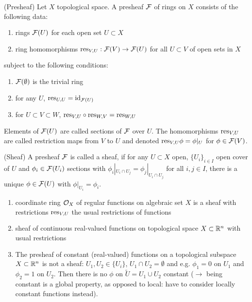 \documentclass[a4paper,11pt]{article}
\begin{document}
			\begin{defi}(Presheaf)
				Let $X$ topological space. A presheaf $\mathcal{F}$ of rings on $X$ consists of the following data:
				\begin{enumerate}
					\item rings $\mathcal{F}(U)$ for each open set $U\subset X$
					\item ring homomorphisms $\mathrm{res}_{V,U}:\mathcal{F}(V)\rightarrow\mathcal{F}(U)$ for all $U\subset V$ of open sets in $X$ 
				\end{enumerate}
				subject to the following conditions:
				\begin{enumerate}
					\item $\mathcal{F}(\emptyset)$ is the trivial ring
					\item for any $U$, $\mathrm{res}_{U,U}=\operatorname{id}_{\mathcal{F}(U)}$
					\item for $U\subset V\subset W$, $\mathrm{res}_{V,U}\circ\mathrm{res}_{W,V}=\mathrm{res}_{W,U}$
				\end{enumerate}
				Elements of $\mathcal{F}(U)$ are called sections of $\mathcal{F}$ over $U$. The homomorphisms $\mathrm{res}_{V,U}$ are called restriction maps from $V$ to $U$ and denoted $\mathrm{res}_{V,U}\phi=\phi|_U$ for $\phi\in\mathcal{F}(V)$.
			\end{defi}

			\begin{defi}
				(Sheaf) A presheaf $\mathcal{F}$ is called a sheaf, if for any $U\subset X$ open, $\{U_i\}_{i\in I}$ open cover of $U$ and $\phi_i\in\mathcal{F}(U_i)$ sections with $\phi_i|_{U_i\cap U_j}=\phi_j|_{U_i\cap U_j}$ for all $i,j\in I$, there is a unique $\phi\in\mathcal{F}(U)$ with $\phi|_{U_i}=\phi_i$.
			\end{defi}

			\begin{eg}
				\begin{enumerate}
					\item coordinate ring $\mathcal{O}_X$ of regular functions on algebraic set $X$ is a sheaf with restrictions $\mathrm{res}_{V,U}$ the usual restrictions of functions
					\item sheaf of continuous real-valued functions on topological space $X\subset \mathbb{R}^n$ with usual restrictions
					\item The presheaf of constant (real-valued) functions on a topological subspace $X\subset\mathbb{R}^n$ is not a sheaf: $U_1,U_2\in\{U_i\}$, $U_1\cap U_2=\emptyset$ and e.g. $\phi_1=0$ on $U_1$ and $\phi_2=1$ on $U_2$. Then there is no $\phi$ on $\tilde{U}=U_1\cup U_2$ constant ($\rightarrow$ being constant is a global property, as opposed to local: have to consider locally constant functions instead).
				\end{enumerate}
			\end{eg}
\end{document}
